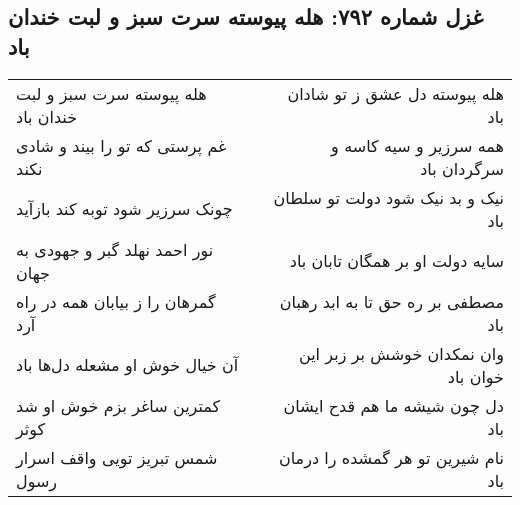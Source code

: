 \begin{center}
\section*{غزل شماره ۷۹۲: هله پیوسته سرت سبز و لبت خندان باد}
\label{sec:0792}
\begin{longtable}{l p{0.5cm} r}
هله پیوسته سرت سبز و لبت خندان باد
&&
هله پیوسته دل عشق ز تو شادان باد
\\
غم پرستی که تو را بیند و شادی نکند
&&
همه سرزیر و سیه کاسه و سرگردان باد
\\
چونک سرزیر شود توبه کند بازآید
&&
نیک و بد نیک شود دولت تو سلطان باد
\\
نور احمد نهلد گبر و جهودی به جهان
&&
سایه دولت او بر همگان تابان باد
\\
گمرهان را ز بیابان همه در راه آرد
&&
مصطفی بر ره حق تا به ابد رهبان باد
\\
آن خیال خوش او مشعله دل‌ها باد
&&
وان نمکدان خوشش بر زبر این خوان باد
\\
کمترین ساغر بزم خوش او شد کوثر
&&
دل چون شیشه ما هم قدح ایشان باد
\\
شمس تبریز تویی واقف اسرار رسول
&&
نام شیرین تو هر گمشده را درمان باد
\\
\end{longtable}
\end{center}
